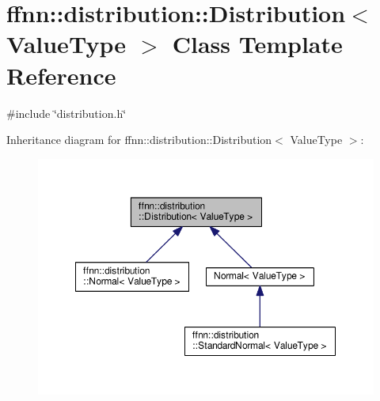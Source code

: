 \hypertarget{classffnn_1_1distribution_1_1_distribution}{\section{ffnn\-:\-:distribution\-:\-:Distribution$<$ Value\-Type $>$ Class Template Reference}
\label{classffnn_1_1distribution_1_1_distribution}
}


{\ttfamily \#include \char`\"{}distribution.\-h\char`\"{}}



Inheritance diagram for ffnn\-:\-:distribution\-:\-:Distribution$<$ Value\-Type $>$\-:\nopagebreak
\begin{figure}[H]
\begin{center}
\leavevmode
\includegraphics[width=350pt]{classffnn_1_1distribution_1_1_distribution__inherit__graph}
\end{center}
\end{figure}

